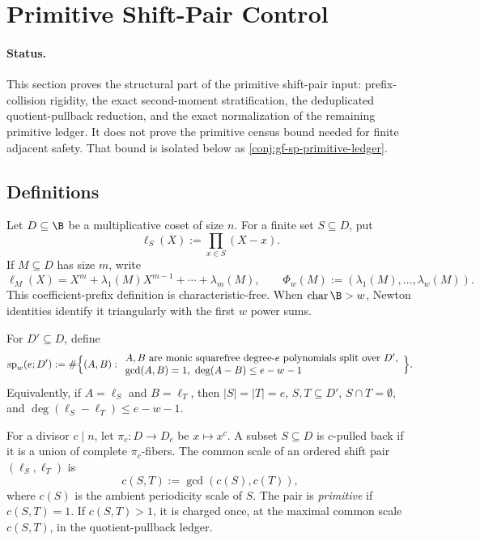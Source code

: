 
\section{Primitive Shift-Pair Control}
\label{sec:gf-sp}

\paragraph{Status.}
This section proves the structural part of the primitive shift-pair input:
prefix-collision rigidity, the exact second-moment stratification, the
deduplicated quotient-pullback reduction, and the exact normalization of the
remaining primitive ledger.  It does not prove the primitive census bound needed
for finite adjacent safety.  That bound is isolated below as
\cref{conj:gf-sp-primitive-ledger}.

\subsection{Definitions}

Let \(D\subseteq\B\) be a multiplicative coset of size \(n\).  For a finite
set \(S\subseteq D\), put
\[
        \ell_S(X):=\prod_{x\in S}(X-x).
\]
If \(M\subseteq D\) has size \(m\), write
\[
        \ell_M(X)=X^m+\lambda_1(M)X^{m-1}+\cdots+\lambda_m(M),
        \qquad
        \Phi_w(M):=(\lambda_1(M),\ldots,\lambda_w(M)).
\]
This coefficient-prefix definition is characteristic-free.  When
\(\operatorname{char}\B>w\), Newton identities identify it triangularly with
the first \(w\) power sums.

\begin{definition}
\label{def:gf-sp-shiftpair}
For \(D'\subseteq D\), define
\[
\mathrm{sp}_w(e;D') :=
\#\Bigl\{(A,B):\begin{array}{l}
A,B \text{ are monic squarefree degree-}e\text{ polynomials split over }D',\\
\gcd(A,B)=1,\ \deg(A-B)\le e-w-1
\end{array}\Bigr\}.
\]
Equivalently, if \(A=\ell_{S}\) and \(B=\ell_T\), then
\(|S|=|T|=e\), \(S,T\subseteq D'\), \(S\cap T=\emptyset\), and
\(\deg(\ell_S-\ell_T)\le e-w-1\).

For a divisor \(c\mid n\), let \(\pi_c:D\to D_c\) be \(x\mapsto x^c\).  A
subset \(S\subseteq D\) is \(c\)-pulled back if it is a union of complete
\(\pi_c\)-fibers.  The common scale of an ordered shift pair
\((\ell_S,\ell_T)\) is
\[
        c(S,T):=\gcd(c(S),c(T)),
\]
where \(c(S)\) is the ambient periodicity scale of \(S\).  The pair is
\emph{primitive} if \(c(S,T)=1\).  If \(c(S,T)>1\), it is charged once, at the
maximal common scale \(c(S,T)\), in the quotient-pullback ledger.
\end{definition}

